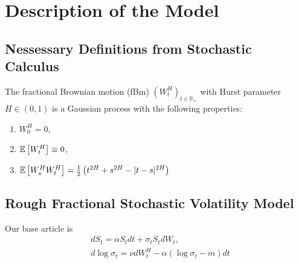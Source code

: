 \section{Description of the Model}
    \subsection{Nessessary Definitions from Stochastic Calculus}
        \begin{definition}
            The fractional Brownian motion (fBm)  $(W_t^H)_{t\in \mathbb{R_+}}$ with Hurst 
            parameter $H \in (0, 1)$ is a Gaussian process with the following properties:
            \begin{enumerate}
                \item $W_0^H = 0$,
                \item $\mathbb{E}\left[W_t^H\right] \equiv 0$,
                \item $\mathbb{E}\left[W_s^H W_t^H\right] = \frac{1}{2} \left(t^{2H} + s^{2H} - |t-s|^{2H}\right)$
            \end{enumerate}
        \end{definition}



    \subsection{Rough Fractional Stochastic Volatility Model}
        Our base article is \cite{GatheralRosenbaum2014}
        \begin{align} \label{model:RFSV}
            &dS_t = \alpha S_tdt + \sigma_t S_tdW_t, \\
            &d\log\sigma_t = \nu dW_t^H - \alpha (\log\sigma_t-m)dt
        \end{align}
